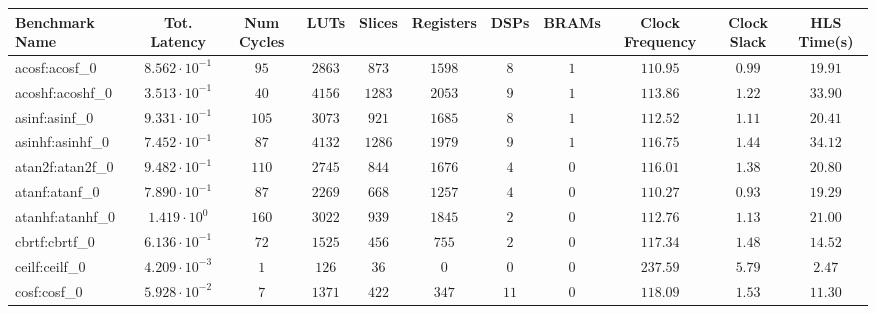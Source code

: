 \begin{tabular}{|l|c|c|c|c|c|c|c|c|c|c|}
\hline
Benchmark Name               & Tot. Latency            & Num Cycles & LUTs      & Slices    & Registers & DSPs    & BRAMs & Clock Frequency & Clock Slack & HLS Time(s) \\
\hline
acosf:acosf\_0               & $ 8.562 \cdot 10^{-1} $ & $ 95     $ & $ 2863  $ & $ 873   $ & $ 1598  $ & $ 8   $ & $ 1 $ & $ 110.95      $ & $ 0.99    $ & $ 19.91   $ \\
acoshf:acoshf\_0             & $ 3.513 \cdot 10^{-1} $ & $ 40     $ & $ 4156  $ & $ 1283  $ & $ 2053  $ & $ 9   $ & $ 1 $ & $ 113.86      $ & $ 1.22    $ & $ 33.90   $ \\
asinf:asinf\_0               & $ 9.331 \cdot 10^{-1} $ & $ 105    $ & $ 3073  $ & $ 921   $ & $ 1685  $ & $ 8   $ & $ 1 $ & $ 112.52      $ & $ 1.11    $ & $ 20.41   $ \\
asinhf:asinhf\_0             & $ 7.452 \cdot 10^{-1} $ & $ 87     $ & $ 4132  $ & $ 1286  $ & $ 1979  $ & $ 9   $ & $ 1 $ & $ 116.75      $ & $ 1.44    $ & $ 34.12   $ \\
atan2f:atan2f\_0             & $ 9.482 \cdot 10^{-1} $ & $ 110    $ & $ 2745  $ & $ 844   $ & $ 1676  $ & $ 4   $ & $ 0 $ & $ 116.01      $ & $ 1.38    $ & $ 20.80   $ \\
atanf:atanf\_0               & $ 7.890 \cdot 10^{-1} $ & $ 87     $ & $ 2269  $ & $ 668   $ & $ 1257  $ & $ 4   $ & $ 0 $ & $ 110.27      $ & $ 0.93    $ & $ 19.29   $ \\
atanhf:atanhf\_0             & $ 1.419 \cdot 10^{0}  $ & $ 160    $ & $ 3022  $ & $ 939   $ & $ 1845  $ & $ 2   $ & $ 0 $ & $ 112.76      $ & $ 1.13    $ & $ 21.00   $ \\
cbrtf:cbrtf\_0               & $ 6.136 \cdot 10^{-1} $ & $ 72     $ & $ 1525  $ & $ 456   $ & $ 755   $ & $ 2   $ & $ 0 $ & $ 117.34      $ & $ 1.48    $ & $ 14.52   $ \\
ceilf:ceilf\_0               & $ 4.209 \cdot 10^{-3} $ & $ 1      $ & $ 126   $ & $ 36    $ & $ 0     $ & $ 0   $ & $ 0 $ & $ 237.59      $ & $ 5.79    $ & $ 2.47    $ \\
cosf:cosf\_0                 & $ 5.928 \cdot 10^{-2} $ & $ 7      $ & $ 1371  $ & $ 422   $ & $ 347   $ & $ 11  $ & $ 0 $ & $ 118.09      $ & $ 1.53    $ & $ 11.30   $ \\

\end{tabular}
